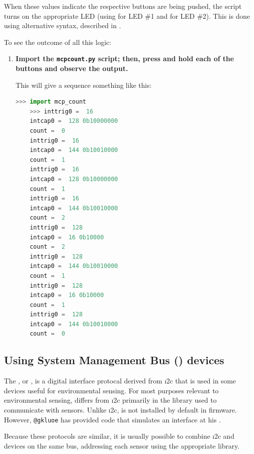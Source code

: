 When these values indicate the respective buttons are being pushed, the script turns on the appropriate LED (using  for LED \#1 and  for LED \#2).
This is done using alternative syntax, described in .

To see the outcome of all this logic:
\begin{enumerate}[resume]
	\item \textbf{Import the \texttt{mcp\textunderscore count.py} script; then, press and hold each of the buttons and observe the output.}

	This will give a sequence something like this:
  \begin{lstlisting}[language=Python]
	>>> import mcp_count
	>>> inttrig0 =  16
	intcap0 =  128 0b10000000
	count =  0
	inttrig0 =  16
	intcap0 =  144 0b10010000
	count =  1
	inttrig0 =  16
	intcap0 =  128 0b10000000
	count =  1
	inttrig0 =  16
	intcap0 =  144 0b10010000
	count =  2
	inttrig0 =  128
	intcap0 =  16 0b10000
	count =  2
	inttrig0 =  128
	intcap0 =  144 0b10010000
	count =  1
	inttrig0 =  128
	intcap0 =  16 0b10000
	count =  1
	inttrig0 =  128
	intcap0 =  144 0b10010000
	count =  0
\end{lstlisting}
\end{enumerate}




\subsection{Using System Management Bus (\smbus) devices}
The , or \smbus, is a digital interface protocal derived from \i2c that is used in some devices useful for environmental sensing.
For most purposes relevant to environmental sensing, \smbus differs from \i2c primarily in the \Micropython library used to communicate with sensors.
Unlike \i2c, \smbus is not installed by default in \Micropython firmware.
However, \verb|@gkluoe| has provided code that simulates an \smbus interface at his .

Because these protocols are similar, it is usually possible to combine \i2c and \smbus devices on the same bus, addressing each sensor using the appropriate library.


